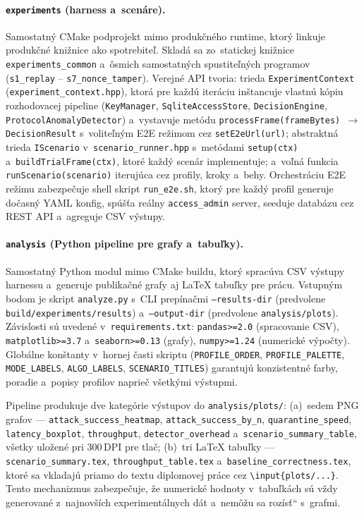 \documentclass[a4paper]{feidipsp}
\providecommand{\uv}[1]{\quotedblbase#1\textquotedblleft}
\begin{document}
\paragraph{\texttt{experiments} (harness a~scenáre).}
Samostatný CMake podprojekt mimo produkčného runtime, ktorý linkuje produkčné knižnice ako spotrebiteľ. Skladá sa zo~statickej knižnice \texttt{experiments\_common} a~ôsmich samostatných spustiteľných programov (\texttt{s1\_replay} -- \texttt{s7\_nonce\_tamper}). Verejné API tvoria: trieda \texttt{ExperimentContext} (\texttt{experiment\_context.hpp}), ktorá pre každú iteráciu inštancuje vlastnú kópiu rozhodovacej pipeline (\texttt{KeyManager}, \texttt{SqliteAccessStore}, \texttt{DecisionEngine}, \texttt{ProtocolAnomalyDetector}) a~vystavuje metódu \texttt{processFrame(frameBytes) $\rightarrow$ DecisionResult} s~voliteľným E2E režimom cez \texttt{setE2eUrl(url)}; abstraktná trieda \texttt{IScenario} v~\texttt{scenario\_runner.hpp} s~metódami \texttt{setup(ctx)} a~\texttt{buildTrialFrame(ctx)}, ktoré každý scenár implementuje; a~voľná funkcia \texttt{runScenario(scenario)} iterujúca cez profily, kroky a~behy. Orchestráciu E2E režimu zabezpečuje shell skript \texttt{run\_e2e.sh}, ktorý pre každý profil generuje dočasný YAML konfig, spúšťa reálny \texttt{access\_admin} server, seeduje databázu cez REST API a~agreguje CSV výstupy.

\paragraph{\texttt{analysis} (Python pipeline pre grafy a~tabuľky).}
Samostatný Python modul mimo CMake buildu, ktorý spracúva CSV výstupy harnessu a~generuje publikačné grafy aj LaTeX tabuľky pre prácu. Vstupným bodom je skript \texttt{analyze.py} s~CLI prepínačmi \texttt{--results-dir} (predvolene \texttt{build/experiments/results}) a~\texttt{--output-dir} (predvolene \texttt{analysis/plots}). Závislosti sú uvedené v~\texttt{requirements.txt}: \texttt{pandas>=2.0} (spracovanie CSV), \texttt{matplotlib>=3.7} a~\texttt{seaborn>=0.13} (grafy), \texttt{numpy>=1.24} (numerické výpočty). Globálne konštanty v~hornej časti skriptu (\texttt{PROFILE\_ORDER}, \texttt{PROFILE\_PALETTE}, \texttt{MODE\_LABELS}, \texttt{ALGO\_LABELS}, \texttt{SCENARIO\_TITLES}) garantujú konzistentné farby, poradie a~popisy profilov naprieč všetkými výstupmi.

Pipeline produkuje dve kategórie výstupov do \texttt{analysis/plots/}: (a)~sedem PNG grafov --- \texttt{attack\_success\_heatmap}, \texttt{attack\_success\_by\_n}, \texttt{quarantine\_speed}, \texttt{latency\_boxplot}, \texttt{throughput}, \texttt{detector\_overhead} a~\texttt{scenario\_summary\_table}, všetky uložené pri 300\,DPI pre tlač; (b)~tri LaTeX tabuľky --- \texttt{scenario\_summary.tex}, \texttt{throughput\_table.tex} a~\texttt{baseline\_correctness.tex}, ktoré sa vkladajú priamo do textu diplomovej práce cez \texttt{\textbackslash input\{plots/...\}}. Tento mechanizmus zabezpečuje, že numerické hodnoty v~tabuľkách sú vždy generované z~najnovších experimentálnych dát a~nemôžu sa \uv{rozísť} s~grafmi.
\end{document}
